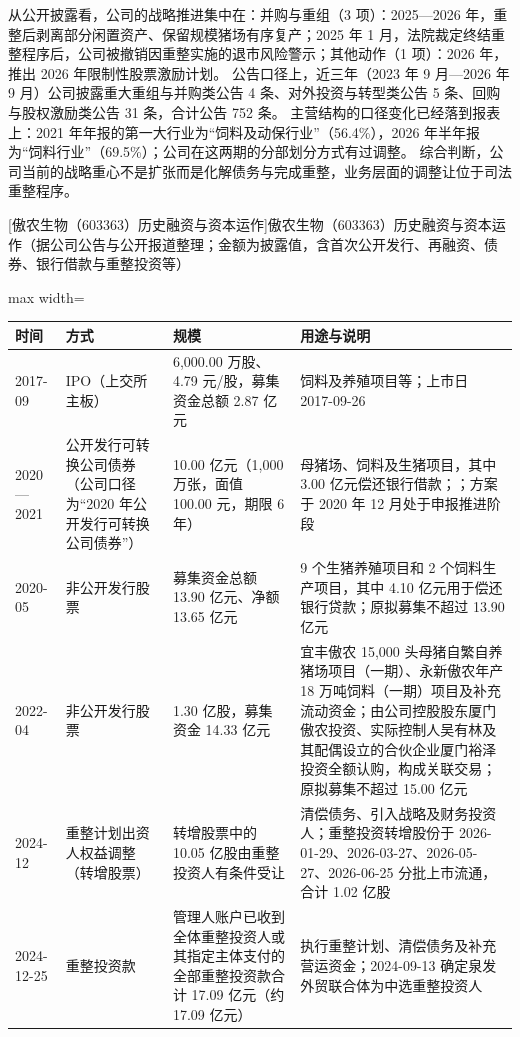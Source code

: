 从公开披露看，公司的战略推进集中在：并购与重组（3 项）：2025---2026 年，重整后剥离部分闲置资产、保留规模猪场有序复产；2025 年 1 月，法院裁定终结重整程序后，公司被撤销因重整实施的退市风险警示；其他动作（1 项）：2026 年，推出 2026 年限制性股票激励计划。 公告口径上，近三年（2023 年 9 月---2026 年 9 月）公司披露重大重组与并购类公告 4 条、对外投资与转型类公告 5 条、回购与股权激励类公告 31 条，合计公告 752 条。 主营结构的口径变化已经落到报表上：2021 年年报的第一大行业为“饲料及动保行业”（56.4\%），2026 年半年报为“饲料行业”（69.5\%）；公司在这两期的分部划分方式有过调整。 综合判断，公司当前的战略重心不是扩张而是化解债务与完成重整，业务层面的调整让位于司法重整程序。

\begin{center}\small\setlength{\tabcolsep}{4pt}
[傲农生物（603363）历史融资与资本运作]{傲农生物（603363）历史融资与资本运作（据公司公告与公开报道整理；金额为披露值，含首次公开发行、再融资、债券、银行借款与重整投资等）}
\begin{adjustbox}{max width=\textwidth}
\begin{tabular}{@{}p{1.45cm}p{2.55cm}p{4.05cm}p{4.95cm}@{}}
\toprule
时间 & 方式 & 规模 & 用途与说明 \\
\midrule
2017-09 & IPO（上交所主板） & 6,\allowbreak{}000.00 万股、\allowbreak{}4.79 元/\allowbreak{}股，\allowbreak{}募集资金总额 2.87 亿元 & 饲料及养殖项目等；上市日 2017-09-26 \\
2020—2021 & 公开发行可转换公司债券（公司口径为“2020 年公开发行可转换公司债券”） & 10.00 亿元（1,\allowbreak{}000 万张，\allowbreak{}面值 100.00 元，\allowbreak{}期限 6 年） & 母猪场、\allowbreak{}饲料及生猪项目，\allowbreak{}其中 3.00 亿元偿还银行借款；；方案于 2020 年 12 月处于申报推进阶段 \\
2020-05 & 非公开发行股票 & 募集资金总额 13.90 亿元、\allowbreak{}净额 13.65 亿元 & 9 个生猪养殖项目和 2 个饲料生产项目，\allowbreak{}其中 4.10 亿元用于偿还银行贷款；原拟募集不超过 13.90 亿元 \\
2022-04 & 非公开发行股票 & 1.30 亿股，\allowbreak{}募集资金 14.33 亿元 & 宜丰傲农 15,\allowbreak{}000 头母猪自繁自养猪场项目（一期）、\allowbreak{}永新傲农年产 18 万吨饲料（一期）项目及补充流动资金；由公司控股股东厦门傲农投资、\allowbreak{}实际控制人吴有林及其配偶设立的合伙企业厦门裕泽投资全额认购，\allowbreak{}构成关联交易；原拟募集不超过 15.00 亿元 \\
2024-12 & 重整计划出资人权益调整（转增股票） & 转增股票中的 10.05 亿股由重整投资人有条件受让 & 清偿债务、\allowbreak{}引入战略及财务投资人；重整投资转增股份于 2026-01-29、\allowbreak{}2026-03-27、\allowbreak{}2026-05-27、\allowbreak{}2026-06-25 分批上市流通，\allowbreak{}合计 1.02 亿股 \\
2024-12-25 & 重整投资款 & 管理人账户已收到全体重整投资人或其指定主体支付的全部重整投资款合计 17.09 亿元（约 17.09 亿元） & 执行重整计划、\allowbreak{}清偿债务及补充营运资金；2024-09-13 确定泉发外贸联合体为中选重整投资人 \\
\bottomrule
\end{tabular}
\end{adjustbox}
\end{center}

